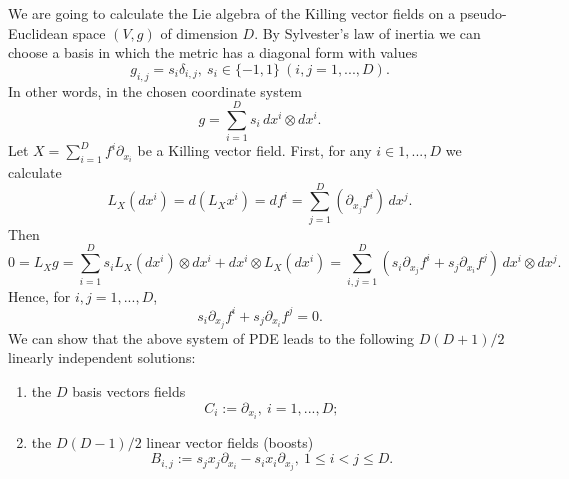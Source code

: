\begin{example}
  We are going to calculate the Lie algebra of the Killing vector fields on a
  pseudo-Euclidean space $(V, g)$ of dimension $D$.
  By Sylvester's law of inertia we can choose a basis in which the metric has a
  diagonal form with values
  \begin{equation}
    g_{i, j} = s_i \delta_{i, j},\ s_i \in \{-1, 1\}\ (i, j = 1, ..., D).
  \end{equation}
  In other words, in the chosen coordinate system
  \begin{equation}
    g = \sum_{i = 1}^D s_i\, d x^i \otimes d x^i.
  \end{equation}
  Let $X = \sum_{i = 1}^D f^i \partial_{x_i}$ be a Killing vector field.
  First, for any $i \in 1, ..., D$ we calculate
  \begin{equation}
    L_X(d x^i)
    = d(L_X x^i)
    = d f^i
    = \sum_{j = 1}^D (\partial_{x_j} f^i)\, d x^j.
  \end{equation}
  Then
  \begin{equation}
    0
    = L_X g
    = \sum_{i = 1}^D s_i L_X(d x^i) \otimes d x^i + d x^i \otimes L_X(d x^i)
    = \sum_{i, j = 1}^D
      (s_i \partial_{x_j} f^i + s_j \partial_{x_i} f^j)\, d x^i \otimes d x^j.
  \end{equation}
  Hence, for $i, j = 1, ..., D$,
  \begin{equation}
    s_i \partial_{x_j} f^i + s_j \partial_{x_i} f^j = 0.
  \end{equation}
  We can show that the above system of PDE leads to the following
  $D (D + 1) / 2$ linearly independent solutions:
  \begin{enumerate}
    \item
      the $D$ basis vectors fields
      \begin{equation}
        C_i := \partial_{x_i},\ i = 1, ..., D;
      \end{equation}
    \item
      the $D (D - 1) / 2$ linear vector fields (boosts)
      \begin{equation}
        B_{i, j}
        := s_j x_j \partial_{x_i} - s_i x_i \partial_{x_j},\
        1 \leq i < j \leq D.
      \end{equation}
  \end{enumerate}
\end{example}
